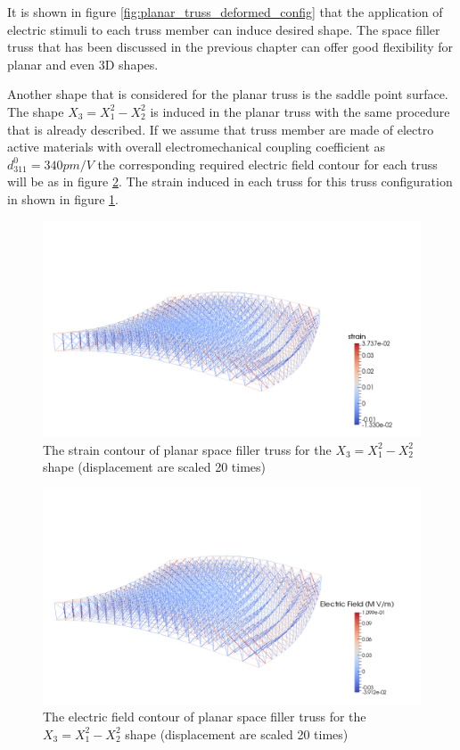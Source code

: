It is shown in figure \ref{fig:planar_truss_deformed_config} that the application of electric stimuli to each truss member can induce desired shape. The space filler truss that has been discussed in the previous chapter can offer good flexibility for planar and even 3D shapes. 

Another shape that is considered for the planar truss is the saddle point surface.
The shape $X_3=X_1^2-X_2^2$ is induced in the planar truss with the same procedure that is already described.
If we assume that truss member are made of electro active materials with overall electromechanical coupling coefficient as $d_{311}^0=340pm/V$ the corresponding required electric field contour for each truss will be as in figure \ref{fig:planar_z_eq_x2_y2_efield_contour}.
The strain induced in each truss for this truss configuration in shown in figure \ref{fig:planar_z_eq_x2_y2_strain_contour}.

\begin{figure} 
\centering
\includegraphics[width=5.0in]{./chap_5_active_trusses/images_space_filler/planar_truss_z_eq_x2_y2_strain.png}
\caption{The strain contour of planar space filler truss for the $X_3=X_1^2-X_2^2$ shape (displacement are scaled 20 times)}
\label{fig:planar_z_eq_x2_y2_strain_contour}
\end{figure} 

\begin{figure} 
\centering
\includegraphics[width=5.0in]{./chap_5_active_trusses/images_space_filler/planar_truss_z_eq_x2_y2_elec_field.png}
\caption{The electric field contour of planar space filler truss for the $X_3=X_1^2-X_2^2$ shape (displacement are scaled 20 times)}
\label{fig:planar_z_eq_x2_y2_efield_contour}
\end{figure} 



